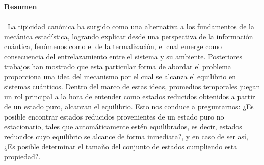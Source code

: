 


\textbf{\LARGE Resumen}\\\\
\
La tipicidad canónica ha surgido como una alternativa a los fundamentos de la mecánica estadística, logrando explicar desde una perspectiva de la información cuántica, fenómenos como el de la termalización, el cual emerge como consecuencia del entrelazamiento entre el sistema y su ambiente.  Posteriores trabajos han mostrado que esta particular forma de abordar el problema proporciona una idea del mecanismo por el cual se alcanza el equilibrio en sistemas cuánticos. Dentro del marco de estas ideas, promedios temporales juegan un rol principal a la hora de entender como estados reducidos obtenidos a partir de un estado puro, alcanzan el equilibrio. Esto nos conduce a preguntarnos: ¿Es posible encontrar estados reducidos provenientes de un estado puro no estacionario, tales que automáticamente estén equilibrados, es decir, estados reducidos cuyo equilibrio se alcance de forma inmediata?, y en caso de ser así, ¿Es posible determinar el tamaño del conjunto de estados cumpliendo esta propiedad?.\\\\

